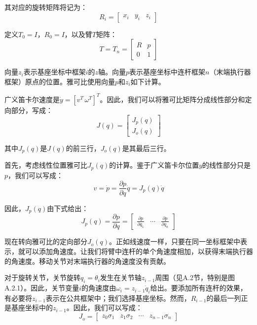 \documentclass[UTF8,a4paper]{ctexart}
\begin{document}
其对应的旋转矩阵将记为：
\begin{equation}
R_i = \begin{bmatrix} x_i & y_i & z_i \end{bmatrix}
\tag{A.3.30}
\end{equation}

定义$T_0 = I$，$R_0 = I$，以及臂$T$矩阵：
\begin{equation}
T = T_n = \begin{bmatrix} R & p \\ 0 & 1 \end{bmatrix}
\tag{A.3.31}
\end{equation}

向量$z_i$表示基座坐标中框架$i$的$z$轴。向量$p$表示基座坐标中连杆框架$n$（末端执行器框架）原点的位置。雅可比使用向量$p$和$z_i$如下计算。

广义笛卡尔速度是$\dot{y} = [v^T \, \omega^T]^T$。因此，我们可以将雅可比矩阵分成线性部分和定向部分，写成：
\begin{equation}
J(q) = \begin{bmatrix} J_p(q) \\ J_o(q) \end{bmatrix}
\tag{A.3.32}
\end{equation}

其中$J_p(q)$是$J(q)$的前三行，$J_o(q)$是其最后三行。

首先，考虑线性位置雅可比$J_p(q)$的计算。鉴于广义笛卡尔位置$y$的线性部分只是$p$，我们可以写成：
\begin{equation}
v = \dot{p} = \frac{\partial p}{\partial q}\dot{q} = J_p(q)\dot{q}
\tag{A.3.33}
\end{equation}

因此，$J_p(q)$由下式给出：
\begin{equation}
J_p(q) = \frac{\partial p}{\partial q} = \begin{bmatrix} \frac{\partial p}{\partial q_1} & \cdots & \frac{\partial p}{\partial q_n} \end{bmatrix}
\tag{A.3.34}
\end{equation}

现在转向雅可比的定向部分$J_o(q)$。正如线速度一样，只要在同一坐标框架中表示，就可以添加角速度。让我们将臂中连杆的单个角速度相加，以获得末端执行器的角速度。移动关节对末端执行器的角速度没有贡献。

对于旋转关节，关节旋转$q_i = \theta_i$发生在关节轴$z_{i-1}$周围（见A.2节，特别是图A.2.1）。因此，关节变量$i$的角速度由$\omega_i = z_{i-1}\dot{q}_i$给出。要添加所有连杆的效果，有必要将$z_{i-1}$表示在公共框架中；我们选择基座坐标。然而，$R_{i-1}$的最后一列正是基座坐标中的$z_{i-1}$。因此，我们可以写成：
\begin{equation}
J_o = \begin{bmatrix} z_0\sigma_1 & z_1\sigma_2 & \cdots & z_{n-1}\sigma_n \end{bmatrix}
\tag{A.3.35}
\end{equation}
\end{document}
